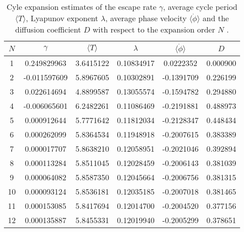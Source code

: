 \begin{table}
	\begin{tabular}{c|c|c|c|c|c}
	 $N$ & $\gamma$ & $\langle T \rangle$ & $\lambda$ & $\langle \dot{\phi} \rangle$ & $D$ \\ 
	\hline
	1 & 0.249829963 & 3.6415122 & 0.10834917 & 0.0222352 & 0.000900 \\ 
 	2 & -0.011597609 & 5.8967605 & 0.10302891 & -0.1391709 & 0.226199 \\ 
 	3 & 0.022614694 & 4.8899587 & 0.13055574 & -0.1594782 & 0.294880 \\ 
 	4 & -0.006065601 & 6.2482261 & 0.11086469 & -0.2191881 & 0.488973 \\ 
 	5 & 0.000912644 & 5.7771642 & 0.11812034 & -0.2128347 & 0.448434 \\ 
 	6 & 0.000262099 & 5.8364534 & 0.11948918 & -0.2007615 & 0.383389 \\ 
 	7 & 0.000017707 & 5.8638210 & 0.12058951 & -0.2021046 & 0.392894 \\ 
 	8 & 0.000113284 & 5.8511045 & 0.12028459 & -0.2006143 & 0.381039 \\ 
 	9 & 0.000064082 & 5.8587350 & 0.12045664 & -0.2006756 & 0.381315 \\ 
 	10 & 0.000093124 & 5.8536181 & 0.12035185 & -0.2007018 & 0.381465 \\ 
 	11 & 0.000153085 & 5.8417694 & 0.12014700 & -0.2004520 & 0.377156 \\ 
 	12 & 0.000135887 & 5.8455331 & 0.12019940 & -0.2005299 & 0.378651 \\ 
 	\end{tabular}
	\caption{Cyle expansion estimates of the escape rate $\gamma$, average cycle period $\langle T \rangle$, Lyapunov exponent $\lambda$, average phase velocity $\langle \dot{\phi} \rangle$ and the diffusion coefficient $D$ with respect to the expansion order $N$ .}
	\label{t-DynamicalAveragesNoGrammar}
\end{table}
